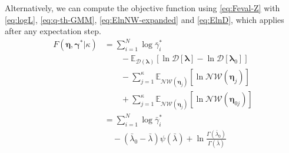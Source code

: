 \documentclass[aps,showpacs,twocolumn,prd,superscriptaddress,nofootinbib]{revtex4}
\newcommand{\nn}{\nonumber}
\newcommand{\E}[1]{{\mathbb E}_{#1}\!}
\begin{document}
Alternatively, we can compute the objective function using \eqref{eq:Feval-Z} with \eqref{eq:logL}, \eqref{eq:q-th-GMM}, \eqref{eq:ElnNW-expanded} and \eqref{eq:ElnD}, which applies after any expectation step.
\begin{align}
  F(\bm\eta,\bm\gamma^*|\kappa)
  &=\sum_{i=1}^N\log\bar\gamma^*_i\nn\\
  &\qquad-\E{\mathcal{D}(\bm\lambda)}\left[\ln{\mathcal{D}[\bm\lambda]}-\ln{\mathcal{D}[\bm\lambda_0]}\right]\nn\\
  &\qquad-\sum_{j=1}^\kappa\E{\mathcal {NW}\left(\bm\eta_j\right)}\left[\ln\mathcal{NW}\left(\bm\eta_j\right)\right]\nn\\
  &\qquad+\sum_{j=1}^\kappa\E{\mathcal {NW}\left(\bm\eta_j\right)}\left[\ln\mathcal{NW}\left(\bm\eta_{0j}\right)\right]\nn\\
    &=\sum_{i=1}^N\log\bar\gamma^*_i\nn\\
    &\quad-(\bar\lambda_0-\bar\lambda)\psi(\bar\lambda)+\ln\frac{\Gamma(\bar\lambda_0)}{\Gamma(\bar\lambda)}\nn\\

\end{align}
\end{document}

